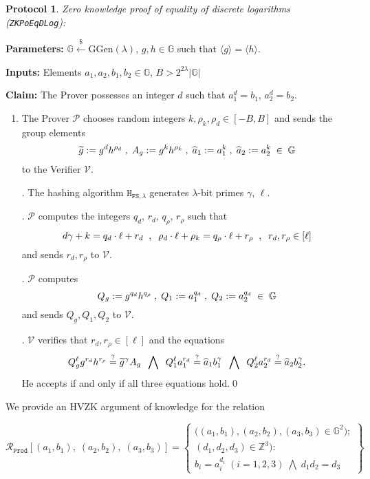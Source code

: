 \documentclass[11pt, lettersize, notitlepage, leqno, footskip=0.6cm]{article}
\newcommand{\ttt}{\texttt}
\newcommand{\bG}{\mathbb{G}}
\newcommand{\la}{\langle}
\newcommand{\ra}{\rangle}
\newcommand{\wti}{\widetilde}
\newcommand{\mc}{\mathcal}
\newcommand{\mb}{\mathbb}
\newcommand{\mr}{\mathrm}
\newcommand{\lam}{\lambda}
\newcommand{\lamb}{\lambda}
\newcommand{\what}{\widehat}
\newcommand{\mP}{\mc{P}}
\newcommand{\V}{\mc{V}}
\newcommand{\vs}{\vspace{-0.15cm}}
\newcommand{\noin}{\noindent}
\newcommand{\sta}{\stackrel{?}{=}}
\newtheorem{Prot}[Thm]{Protocol}
\numberwithin{equation}{section}
\begin{document}
\begin{Prot} \normalfont \hypertarget{EqDLog}{\textit{Zero knowledge proof of equality of discrete logarithms}} (\verb|ZKPoEqDLog|):\end{Prot} \vspace{-0.3cm}

\noin \textbf{Parameters:} $\mb{G}\xleftarrow{\$} \mr{GGen}(\lamb)$,  $g,h\in \mb{G}$ such that $\la g \ra = \la h \ra$.

\noin \textbf{Inputs:} Elements $a_1, a_2, b_1, b_2 \in \mb{G}$, $B > 2^{2\lam}|\bG|$

\noin \textbf{Claim:} The Prover possesses an integer $d$ such that $a_1^{d} = b_1$, $a_2^{d} = b_2$.

\begin{enumerate}[wide, labelwidth=!, labelindent=0pt]\vs \item The Prover $\mP$ chooses random integers $k, \rho_k, \rho_d\in [-B, B] $ and sends the group elements \vs $$\wti{g}:= g^d h^{\rho_d}\;,\; A_g:= g^k h^{\rho_k}\;,\; \what{a}_1:= a_1^{k}\;,\; \what{a}_2:= a_2^k \;\in\;\bG \vs $$ to the Verifier $\V$.

\noin 2. The hashing algorithm $\ttt{H}_{\ttt{FS},\lam}$ generates $\lam$-bit primes $\gamma$, $\ell$.

\noin 3. $\mP$ computes the integers $q_d$, $r_d$, $q_{\rho}$, $r_{\rho}$ such that \vs $$ d\gamma+k = q_d\cdot\ell+r_d\;\;,\;\;\rho_d\cdot \ell + \rho_k = q_{\rho}\cdot \ell + r_{\rho}\;\;,\;\; r_d,r_{\rho}\in[\ell]\vs $$ and sends $r_d,r_{\rho}$ to $\V$.

\noin 4. $\mP$ computes $$Q_g:= g^{q_{d}}h^{q_{\rho}}\;,\; Q_1:= a_1^{q_d}\;,\; Q_2:= a_2^{q_d}\;\in\;\bG \vs $$ and sends $Q_g, Q_1,Q_2$ to $\V$.

\noin 5. $\V$ verifies that $r_d,r_{\rho}\in [\ell]$ and the equations \vs $$Q_g^{\ell}g^{r_d}h^{r_{\rho}}  \sta \wti{g}^{\gamma}A_g\;\;\bigwedge\;\; Q_1^{\ell}a_1^{r_d}\sta \what{a}_1b_1^{\gamma}\;\;\bigwedge\;\; Q_2^{\ell}a_2^{r_d}\sta \what{a}_2b_2^{\gamma}. \vs $$ He accepts if and only if all three equations hold.\qed \end{enumerate}

\bigskip

\noin We provide an HVZK argument of knowledge for the relation 

\[
  \mc{R}_{{\ttt{Prod}}}[(a_1, b_1),\;(a_2,b_2),\;(a_3,b_3)] = \left\{\begin{array}{l}
    \big((a_1, b_1), (a_2,b_2), (a_3,b_3)\in\mb{G}^2);\\
    (d_1, d_2, d_3)\in\mb{Z}^3): \\
    b_i = a_i^{d_i}\;(i=1,2,3)\; \bigwedge\; d_1d_2 = d_3
  \end{array}\right\}
\] 
\end{document}
